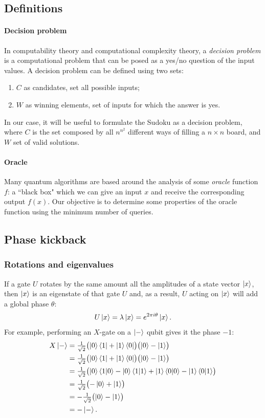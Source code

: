 \documentclass{article}
\begin{document}
\subsection{Definitions}

\paragraph{Decision problem}
In computability theory and computational complexity theory, a
\emph{decision  problem} is a computational problem that can be posed as a
yes/no question of the input values.
A decision problem can be defined using two sets:
\begin{enumerate}
  \item
  $C$ as candidates, set all possible inputs;
  \item
  $W$ as winning elements, set of inputs for which the answer is yes.
\end{enumerate}
In our case, it will be useful to formulate the Sudoku as a decision problem,
where $C$ is the set composed by all $n^{n^2}$ different ways of filling a
$n \times n$ board, and $W$ set of valid solutions.

\paragraph{Oracle}
Many quantum algorithms are based around the analysis of some \emph{oracle}
function $f$: a ``black box" which we can give an input $x$
and receive the corresponding output $f(x)$.
Our objective is to determine some properties of the oracle function using the
minimum number of queries.

\subsection{Phase kickback}
\subsubsection{Rotations and eigenvalues}
If a gate $U$ rotates by the same amount all the amplitudes of a
state vector $\ket{x}$, then $\ket{x}$ is an eigenstate of that gate $U$ and,
as a result, $U$ acting on $\ket{x}$ will add a global phase $\theta$:
\[
  U \ket{x} = \lambda \ket{x} = e^{2 \pi i \theta} \ket{x}.
\]
For example, performing an $X$-gate on a $\ket{-}$ qubit gives it the phase
$-1$:
\begin{align*}
  X \ket{-}
  & = \tfrac{1}{\sqrt{2}}  \bigl( \ket{0}\bra{1} + \ket{1}\bra{0} \bigr)
      \bigl( \ket{0} - \ket{1} \bigr) \\
  & = \tfrac{1}{\sqrt{2}} \bigl( \ket{0}\bra{1} + \ket{1}\bra{0} \bigr)
      \bigl( \ket{0} - \ket{1} \bigr) \\
  & = \tfrac{1}{\sqrt{2}} \bigl( \ket{0}\braket{1|0} - \ket{0}\braket{1|1}
     + \ket{1}\braket{0|0} - \ket{1}\braket{0|1}  \bigr) \\
  & = \tfrac{1}{\sqrt{2}} \bigl( -\ket{0}  + \ket{1} \bigr) \\
  & =  - \tfrac{1}{\sqrt{2}} \bigl( \ket{0}  - \ket{1} \bigr) \\
  & =  - \ket{-}.
\end{align*}
\end{document}
